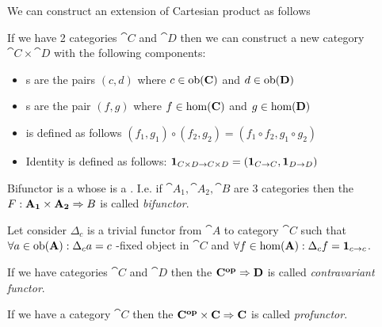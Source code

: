 We can construct an extension of Cartesian product as follows
\begin{definition}
\label{def:category_product}
If we have 2 categories $\cat{C}$ and $\cat{D}$ then we can construct
a new category $\cat{C} \times \cat{D}$ with the following components:
\begin{itemize}
\item {}s are the pairs $(c,d)$ where $c \in
  \mathrm{ob}(\mathbf{C})$ and $d \in \mathrm{ob}(\mathbf{D})$
\item {}s are the pair $(f,g)$ where $f \in
  \mathrm{hom}(\mathbf{C})$ and $g \in \mathrm{hom}(\mathbf{D})$
\item {} is defined as follows 
\(
(f_1, g_1) \circ (f_2, g_2) = (f_1 \circ f_2, g_1 \circ g_2)
\)
\item Identity is defined as follows: $\mathbf{1}_{ C \times D \to C \times D } = 
\left(\mathbf{1}_{ C \to C }, \mathbf{1}_{ D \to D }\right)$
\end{itemize}
\end{definition}

\begin{definition}[Bifunctor]
\label{def:bifunctor}
Bifunctor is a  whose  is
a . I.e. if $\cat{A_1}, \cat{A_2},
\cat{B}$ are 3 categories then the  
\(
F: \mathbf{A_1} \times \mathbf{A_2} \Rightarrow B
\) is called \textit{bifunctor}.
\end{definition}

\begin{definition}
\label{def:terminal_object_cat}
Let consider $\Delta_c$ is a trivial functor from 
$\cat{A}$ to category $\cat{C}$ such that $\forall a \in \mathrm{ob}(\mathbf{A}):
\Delta_c a = c$ -fixed object in $\cat{C}$ and 
$\forall f \in \mathrm{hom}(\mathbf{A}): \Delta_c f = \mathbf{1}_{ c \to c }$.
\end{definition}

\begin{definition}
\label{def:contravariant_functor}
If we have categories $\cat{C}$ and $\cat{D}$ then the
 $\mathbf{C^{op}} \Rightarrow \mathbf{D}$ is called
\textit{contravariant functor}. 
\end{definition}

\begin{definition}[Profunctor]
\label{def:profunctor}
If we have a category $\cat{C}$ then the 
$\mathbf{C^{op}} \times \mathbf{C} \Rightarrow \mathbf{C}$ is called
\textit{profunctor}. 
\end{definition}

